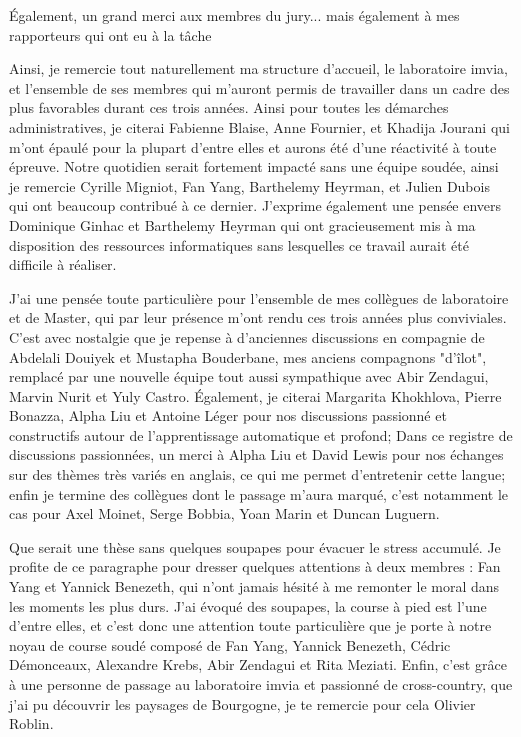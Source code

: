 \documentclass[english,standardlists]{spimubphdthesis}
\begin{document}
Également, un grand merci aux membres du jury... mais également à mes rapporteurs qui ont eu à la tâche\par

Ainsi, je remercie tout naturellement ma structure d'accueil, le laboratoire \gls{imvia}, et l'ensemble de ses membres qui m'auront permis de travailler dans un cadre des plus favorables durant ces trois années. Ainsi pour toutes les démarches administratives, je citerai Fabienne Blaise, Anne Fournier, et Khadija Jourani qui m'ont épaulé pour la plupart d'entre elles et aurons été d'une réactivité à toute épreuve. Notre quotidien serait fortement impacté sans une équipe soudée, ainsi je remercie Cyrille Migniot, Fan Yang, Barthelemy Heyrman, et Julien Dubois qui ont beaucoup contribué à ce dernier. J'exprime également une pensée envers Dominique Ginhac et Barthelemy Heyrman qui ont gracieusement mis à ma disposition des ressources informatiques sans lesquelles ce travail aurait été difficile à réaliser.\par

J'ai une pensée toute particulière pour l'ensemble de mes collègues de laboratoire et de Master, qui par leur présence m'ont rendu ces trois années plus conviviales. C'est avec nostalgie que je repense à d'anciennes discussions en compagnie de Abdelali Douiyek et Mustapha Bouderbane, mes anciens compagnons "d'îlot", remplacé par une nouvelle équipe tout aussi sympathique avec Abir Zendagui, Marvin Nurit et Yuly Castro. Également, je citerai Margarita Khokhlova, Pierre Bonazza, Alpha Liu et Antoine Léger pour nos discussions passionné et constructifs autour de l'apprentissage automatique et profond; Dans ce registre de discussions passionnées, un merci à Alpha Liu et David Lewis pour nos échanges sur des thèmes très variés en anglais, ce qui me permet d'entretenir cette langue; enfin je termine des collègues dont le passage m'aura marqué, c'est notamment le cas pour Axel Moinet, Serge Bobbia, Yoan Marin et Duncan Luguern.\par

Que serait une thèse sans quelques soupapes pour évacuer le stress accumulé. Je profite de ce paragraphe pour dresser quelques attentions à deux membres : Fan Yang et Yannick Benezeth, qui n'ont jamais hésité à me remonter le moral dans les moments les plus durs. J'ai évoqué des soupapes, la course à pied est l'une d'entre elles, et c'est donc une attention toute particulière que je porte à notre noyau de course soudé composé de Fan Yang, Yannick Benezeth, Cédric Démonceaux, Alexandre Krebs, Abir Zendagui et Rita Meziati. Enfin, c'est grâce à une personne de passage au laboratoire \gls{imvia} et passionné de cross-country, que j'ai pu découvrir les paysages de Bourgogne, je te remercie pour cela Olivier Roblin.\par
\end{document}
